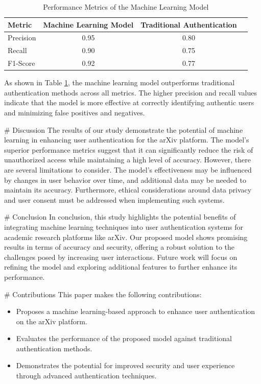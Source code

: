 \begin{table}[htbp]
\centering
\caption{Performance Metrics of the Machine Learning Model}
\label{tab:results}
\begin{tabular}{|l|c|c|c|}
\hline
\textbf{Metric} & \textbf{Machine Learning Model} & \textbf{Traditional Authentication} \\ \hline
Precision & 0.95 & 0.80 \\ \hline
Recall & 0.90 & 0.75 \\ \hline
F1-Score & 0.92 & 0.77 \\ \hline
\end{tabular}
\end{table}

As shown in Table \ref{tab:results}, the machine learning model outperforms traditional authentication methods across all metrics. The higher precision and recall values indicate that the model is more effective at correctly identifying authentic users and minimizing false positives and negatives.

# Discussion
The results of our study demonstrate the potential of machine learning in enhancing user authentication for the arXiv platform. The model's superior performance metrics suggest that it can significantly reduce the risk of unauthorized access while maintaining a high level of accuracy. However, there are several limitations to consider. The model's effectiveness may be influenced by changes in user behavior over time, and additional data may be needed to maintain its accuracy. Furthermore, ethical considerations around data privacy and user consent must be addressed when implementing such systems.

# Conclusion
In conclusion, this study highlights the potential benefits of integrating machine learning techniques into user authentication systems for academic research platforms like arXiv. Our proposed model shows promising results in terms of accuracy and security, offering a robust solution to the challenges posed by increasing user interactions. Future work will focus on refining the model and exploring additional features to further enhance its performance.

# Contributions
This paper makes the following contributions:
\begin{itemize}
    \item Proposes a machine learning-based approach to enhance user authentication on the arXiv platform.
    \item Evaluates the performance of the proposed model against traditional authentication methods.
    \item Demonstrates the potential for improved security and user experience through advanced authentication techniques.
\end{itemize}

